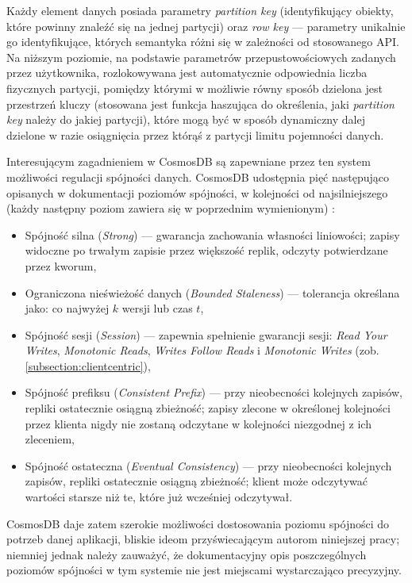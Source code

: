 Każdy element danych posiada parametry \textit{partition key} (identyfikujący obiekty, które powinny znaleźć się na jednej partycji) oraz \textit{row key} --- parametry unikalnie go identyfikujące, których semantyka różni się w zależności od stosowanego API. Na niższym poziomie, na podstawie parametrów przepustowościowych zadanych przez użytkownika, rozlokowywana jest automatycznie odpowiednia liczba fizycznych partycji, pomiędzy którymi w możliwie równy sposób dzielona jest przestrzeń kluczy (stosowana jest funkcja haszująca do określenia, jaki \textit{partition key} należy do jakiej partycji)\cite{cosmopart}, które mogą być w sposób dynamiczny dalej dzielone w razie osiągnięcia przez którąś z partycji limitu pojemności danych.

Interesującym zagadnieniem w CosmosDB są zapewniane przez ten system możliwości regulacji spójności danych. CosmosDB udostępnia pięć następująco opisanych w dokumentacji poziomów spójności, w kolejności od najsilniejszego (każdy następny poziom zawiera się w poprzednim wymienionym) \cite{cosmoscons}:
\begin{itemize}
    \item Spójność silna (\textit{Strong}) --- gwarancja zachowania własności liniowości; zapisy widoczne po trwałym zapisie przez większość replik, odczyty potwierdzane przez kworum,
    \item Ograniczona nieświeżość danych (\textit{Bounded Staleness}) --- tolerancja określana jako: co najwyżej $k$ wersji lub czas $t$,
    \item Spójność sesji (\textit{Session}) --- zapewnia spełnienie gwarancji sesji: \textit{Read Your Writes}, \textit{Monotonic Reads}, \textit{Writes Follow Reads} i \textit{Monotonic Writes} (zob. \ref{subsection:clientcentric}),
    \item Spójność prefiksu (\textit{Consistent Prefix}) --- przy nieobecności kolejnych zapisów, repliki ostatecznie osiągną zbieżność; zapisy zlecone w określonej kolejności przez klienta nigdy nie zostaną odczytane w kolejności niezgodnej z ich zleceniem,
    \item Spójność ostateczna (\textit{Eventual Consistency}) --- przy nieobecności kolejnych zapisów, repliki ostatecznie osiągną zbieżność; klient może odczytywać wartości starsze niż te, które już wcześniej odczytywał.
\end{itemize}

CosmosDB daje zatem szerokie możliwości dostosowania poziomu spójności do potrzeb danej aplikacji, bliskie ideom przyświecającym autorom niniejszej pracy; niemniej jednak należy zauważyć, że dokumentacyjny opis poszczególnych poziomów spójności w tym systemie nie jest miejscami wystarczająco precyzyjny.





